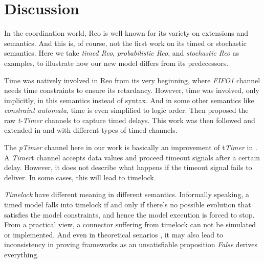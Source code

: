 \section{Discussion}
\label{sec:discussion}

In the coordination world, Reo is well known for its variety on extensions and semantics\cite{Jongmans2012}. And this is, of course, not the first work on its timed or stochastic semantics. Here we take \emph{timed Reo}, \emph{probabilistic Reo}, and \emph{stochastic Reo} as examples, to illustrate how our new model differs from its predecessors.

\vspace{0.5em}
 Time was natively involved in Reo from its very beginning\cite{ARBAB2004}, where \emph{FIFO1} channel needs time constraints to ensure its retardancy. However, time was involved, only implicitly, in this semantics instead of syntax. And in some other semantics like \emph{constraint automata}, time is even simplified to logic order. Then \cite{Arbab2006} proposed the raw \emph{t-Timer} channels to capture timed delays. This work was then followed and extended in \cite{Meng2007} and \cite{Meng2012} with different types of timed channels.

The \emph{pTimer} channel here in our work is basically an improvement of t\emph{Timer} in \cite{Meng2012}. A \emph{Timer}t channel accepts data values and proceed timeout signals after a certain delay. However, it does not describe what happens if the timeout signal fails to deliver. In some cases, this will lead to timelock.

\emph{Timelock} have different meaning in different semantics. Informally speaking, a timed model falls into timelock if and only if there's no possible evolution that satisfies the model constraints, and hence the model execution is forced to stop. From a practical view, a connector suffering from timelock can not be simulated or implemented. And even in theoretical senarios \cite{Li2015}, it may also lead to inconsistency in proving frameworks as an unsatisfiable proposition \emph{False} derives everything.


